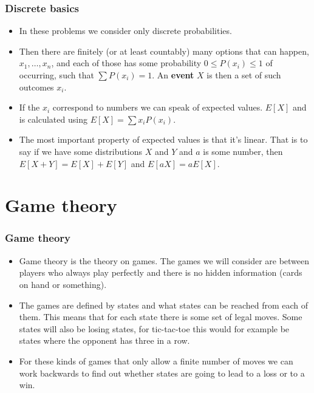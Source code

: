 \documentclass{beamer}
\begin{document}
\begin{frame}[plain]
\frametitle{Discrete basics}

\begin{itemize}

\item In these problems we consider only discrete probabilities.

\item Then there are finitely (or at least countably) many options that can happen, $x_1, \dots, x_n$, and each of those has some probability $0 \leq P(x_i) \leq 1$ of occurring, such that $\sum P(x_i) = 1$. An \textbf{event} $X$ is then a set of such outcomes $x_i$.

\item If the $x_i$ correspond to numbers we can speak of expected values. $E[X]$ and is calculated using $E[X] = \sum x_i P(x_i)$.

\item The most important property of expected values is that it's linear. That is to say if we have some distributions $X$ and $Y$ and $a$ is some number, then $E[X + Y] = E[X] + E[Y]$ and $E[aX] = aE[X]$.

\end{itemize}

\end{frame}

\section*{Game theory}

\begin{frame}[plain]
\frametitle{Game theory}

\begin{itemize}

\item Game theory is the theory on games. The games we will consider are between players who always play perfectly and there is no hidden information (cards on hand or something).

\item The games are defined by states and what states can be reached from each of them. This means that for each state there is some set of legal moves. Some states will also be losing states, for tic-tac-toe this would for example be states where the opponent has three in a row.

\item For these kinds of games that only allow a finite number of moves we can work backwards to find out whether states are going to lead to a loss or to a win.

\end{itemize}

\end{frame}
\end{document}
